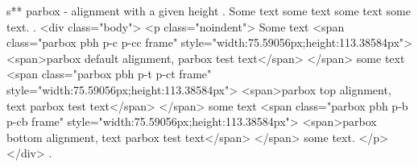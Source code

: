 s** parbox - alignment with a given height
.
\noindent
Some text
some text
some text
some text.
.
<div class="body">
<p class="noindent">
Some text <span class="parbox pbh p-c p-cc frame" style="width:75.59056px;height:113.38584px">
<span>parbox default alignment, parbox test text</span>
</span> some text <span class="parbox pbh p-t p-ct frame" style="width:75.59056px;height:113.38584px">
<span>parbox top alignment, text parbox test text</span>
</span> some text <span class="parbox pbh p-b p-cb frame" style="width:75.59056px;height:113.38584px">
<span>parbox bottom alignment, text parbox test text</span>
</span> some text.
</p>
</div>
.

